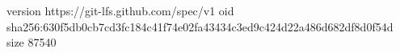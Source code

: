 version https://git-lfs.github.com/spec/v1
oid sha256:630f5db0cb7cd3fc184c41f74e02fa43434c3ed9c424d22a486d682df8d0f54d
size 87540
